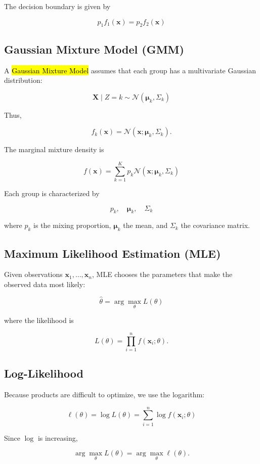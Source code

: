 \documentclass[a4paper,11pt]{article}
\begin{document}
The decision boundary is given by

$$
\boxed{
p_1f_1(\mathbf{x})=p_2f_2(\mathbf{x})
}
$$

\subsection{Gaussian Mixture Model (GMM)}

A \hl{Gaussian Mixture Model} assumes that each group has a multivariate
Gaussian distribution:

$$
\boxed{
\mathbf{X}\mid Z=k
\sim
\mathcal{N}(\boldsymbol{\mu}_k,\Sigma_k)
}
$$

Thus,

$$
f_k(\mathbf{x})
=
\mathcal{N}(\mathbf{x};
\boldsymbol{\mu}_k,\Sigma_k).
$$

The marginal mixture density is

$$
\boxed{
f(\mathbf{x})
=
\sum_{k=1}^K
p_k\mathcal{N}(\mathbf{x};
\boldsymbol{\mu}_k,\Sigma_k)
}
$$

Each group is characterized by

$$
\boxed{
p_k,\quad\boldsymbol{\mu}_k,\quad\Sigma_k
}
$$

where $p_k$ is the mixing proportion, $\boldsymbol{\mu}_k$ the mean, and
$\Sigma_k$ the covariance matrix.

\subsection{Maximum Likelihood Estimation (MLE)}

Given observations $\mathbf{x}_1,\ldots,\mathbf{x}_n$, MLE chooses the
parameters that make the observed data most likely:

$$
\boxed{
\hat{\theta}
=
\arg\max_\theta L(\theta)
}
$$

where the likelihood is

$$
L(\theta)
=
\prod_{i=1}^n f(\mathbf{x}_i;\theta).
$$

\subsection{Log-Likelihood}

Because products are difficult to optimize, we use the logarithm:

$$
\boxed{
\ell(\theta)
=
\log L(\theta)
=
\sum_{i=1}^n
\log f(\mathbf{x}_i;\theta)
}
$$

Since $\log$ is increasing,

$$
\arg\max_\theta L(\theta)
=
\arg\max_\theta\ell(\theta).
$$
\end{document}
